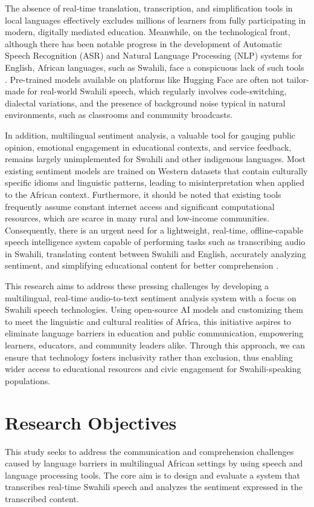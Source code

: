 \noindent The absence of real-time translation, transcription, and simplification tools in local languages effectively excludes millions of learners from fully participating in modern, digitally mediated education. Meanwhile, on the technological front, although there has been notable progress in the development of Automatic Speech Recognition (ASR) and Natural Language Processing (NLP) systems for English, African languages, such as Swahili, face a conspicuous lack of such tools \cite{shikali2019better}. Pre-trained models available on platforms like Hugging Face are often not tailor-made for real-world Swahili speech, which regularly involves code-switching, dialectal variations, and the presence of background noise typical in natural environments, such as classrooms and community broadcasts.

\noindent In addition, multilingual sentiment analysis, a valuable tool for gauging public opinion, emotional engagement in educational contexts, and service feedback, remains largely unimplemented for Swahili and other indigenous languages. Most existing sentiment models are trained on Western datasets that contain culturally specific idioms and linguistic patterns, leading to misinterpretation when applied to the African context. Furthermore, it should be noted that existing tools frequently assume constant internet access and significant computational resources, which are scarce in many rural and low-income communities. Consequently, there is an urgent need for a lightweight, real-time, offline-capable speech intelligence system capable of performing tasks such as transcribing audio in Swahili, translating content between Swahili and English, accurately analyzing sentiment, and simplifying educational content for better comprehension \cite{ismail2020development}.

\noindent This research aims to address these pressing challenges by developing a multilingual, real-time audio-to-text sentiment analysis system with a focus on Swahili speech technologies. Using open-source AI models and customizing them to meet the linguistic and cultural realities of Africa, this initiative aspires to eliminate language barriers in education and public communication, empowering learners, educators, and community leaders alike. Through this approach, we can ensure that technology fosters inclusivity rather than exclusion, thus enabling wider access to educational resources and civic engagement for Swahili-speaking populations.

\section{Research Objectives}
This study seeks to address the communication and comprehension challenges caused by language barriers in multilingual African settings by using speech and language processing tools. The core aim is to design and evaluate a system that transcribes real-time Swahili speech and analyzes the sentiment expressed in the transcribed content.

